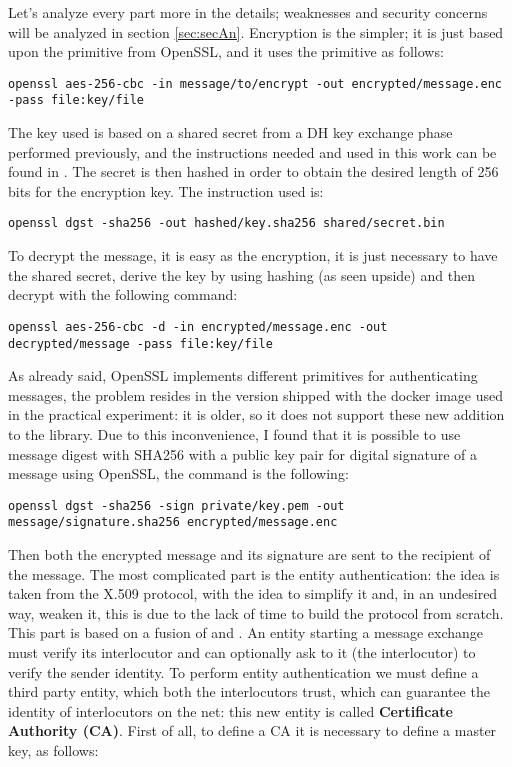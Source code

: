 \documentclass{article}
\begin{document}
Let's analyze every part more in the details; weaknesses and security concerns will be analyzed in section \ref{sec:secAn}.\newline
Encryption is the simpler; it is just based upon the primitive from OpenSSL, and it uses the primitive as follows: 

\begin{lstlisting}[breaklines]
openssl aes-256-cbc -in message/to/encrypt -out encrypted/message.enc -pass file:key/file
\end{lstlisting}

The key used is based on a shared secret from a DH key exchange phase performed previously, and the instructions needed and used in this work can be found in \cite{DHKE}. The secret is then hashed in order to obtain the desired length of 256 bits for the encryption key. The instruction used is:

\begin{lstlisting}[breaklines]
openssl dgst -sha256 -out hashed/key.sha256 shared/secret.bin
\end{lstlisting}

To decrypt the message, it is easy as the encryption, it is just necessary to have the shared secret, derive the key by using hashing (as seen upside) and then decrypt with the following command:

\begin{lstlisting}[breaklines]
openssl aes-256-cbc -d -in encrypted/message.enc -out decrypted/message -pass file:key/file
\end{lstlisting}
\label{ins:AES}

As already said, OpenSSL implements different primitives for authenticating messages, the problem resides in the version shipped with the docker image used in the practical experiment: it is older, so it does not support these new addition to the library. Due to this inconvenience, I found \cite{signatures} that it is possible to use message digest with SHA256 with a public key pair for digital signature of a message using OpenSSL, the command is the following:

\begin{lstlisting}[breaklines]
openssl dgst -sha256 -sign private/key.pem -out message/signature.sha256 encrypted/message.enc
\end{lstlisting}

Then both the encrypted message and its signature are sent to the recipient of the message. \newline
The most complicated part is the entity authentication: the idea is taken from the X.509 protocol, with the idea to simplify it and, in an undesired way, weaken it, this is due to the lack of time to build the protocol from scratch. This part is based on a fusion of \cite{certificates1} and \cite{certificates2}. An entity starting a message exchange must verify its interlocutor and can optionally ask to it (the interlocutor) to verify the sender identity. To perform entity authentication we must define a third party entity, which both the interlocutors trust, which can guarantee the identity of interlocutors on the net: this new entity is called \textbf{Certificate Authority (CA)}. First of all, to define a CA it is necessary to define a master key, as follows: 
\end{document}
